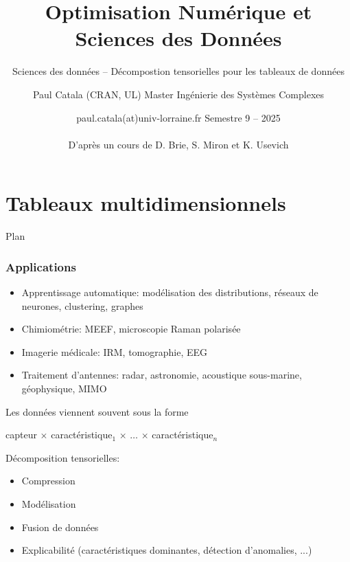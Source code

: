 \documentclass[9pt,table]{beamer} %
\title{Optimisation Numérique et Sciences des Données}
\subtitle{Sciences des données -- Décompostion tensorielles pour les tableaux de données}
\author{Paul Catala (CRAN, UL) \hfill Master Ingénierie des Systèmes Complexes}
\date{paul.catala(at)univ-lorraine.fr \hfill Semestre 9 -- 2025 \\ \\ D'après un cours de D. Brie, S. Miron et K. Usevich}
\begin{document}
\maketitle

\section{Tableaux multidimensionnels}

\begin{frame}{Plan}
\tableofcontents[currentsection]
\end{frame}

\begin{frame}
\frametitle{Applications}

\begin{itemize}
	\item[\tiny$\blacksquare$] \alert{Apprentissage automatique}: modélisation des distributions, réseaux de neurones, clustering, graphes
	\item[\tiny$\blacksquare$] \alert{Chimiométrie}: MEEF, microscopie Raman polarisée
	\item[\tiny$\blacksquare$] \alert{Imagerie médicale}: IRM, tomographie, EEG
	\item[\tiny$\blacksquare$] \alert{Traitement d'antennes}: radar, astronomie, acoustique sous-marine, géophysique, MIMO
\end{itemize}

\begin{tcolorbox}
Les données viennent souvent sous la forme
\begin{center}
capteur $\times$ caractéristique$_1$ $\times$ $\ldots$ $\times$ caractéristique$_n$
\end{center}

Décomposition tensorielles:
\begin{itemize}
	\item[-] Compression
	\item[-] Modélisation
	\item[-] Fusion de données
	\item[-] Explicabilité (caractéristiques dominantes, détection d'anomalies, ...)
\end{itemize} 
\end{tcolorbox}
\end{frame}
\end{document}
